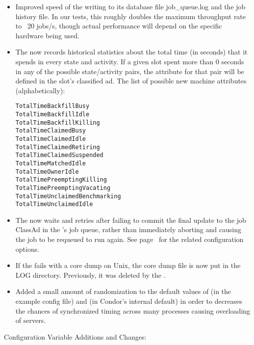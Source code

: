 \begin{itemize}

\item Improved speed of the  writing to its database
file job\_queue.log and the job history file.  In our tests, this
roughly doubles the maximum throughput rate to ~20 jobs/s, though actual
performance will depend on the specific hardware being used.

\item The  now records historical statistics about the
  total time (in seconds) that it spends in every state and activity.
  If a given slot spent more than 0 seconds in any of the possible
  state/activity pairs, the  attribute for that
  pair will be defined in the slot's classified ad.
  The list of possible new machine attributes (alphabetically):
\begin{verbatim}
TotalTimeBackfillBusy
TotalTimeBackfillIdle
TotalTimeBackfillKilling
TotalTimeClaimedBusy
TotalTimeClaimedIdle
TotalTimeClaimedRetiring
TotalTimeClaimedSuspended
TotalTimeMatchedIdle
TotalTimeOwnerIdle
TotalTimePreemptingKilling
TotalTimePreemptingVacating
TotalTimeUnclaimedBenchmarking
TotalTimeUnclaimedIdle
\end{verbatim}

\item The  now waits and retries after failing to
commit the final update to the job ClassAd in the 's
job queue, rather than immediately aborting and causing the job to be
requeued to run again.  See
page~\pageref{param:ShadowMaxJobCleanupRetries} for the related
configuration options.

\item If the  fails with a core dump on Unix, the
core dump file is now put in the LOG directory.  Previously, it
was deleted by the .

\item Added a small amount of randomization to the default values of
 (in the example config file) and
 (in Condor's internal default) in
order to decreases the chances of synchronized timing across many
processes causing overloading of servers.

\end{itemize}

\noindent Configuration Variable Additions and Changes:

